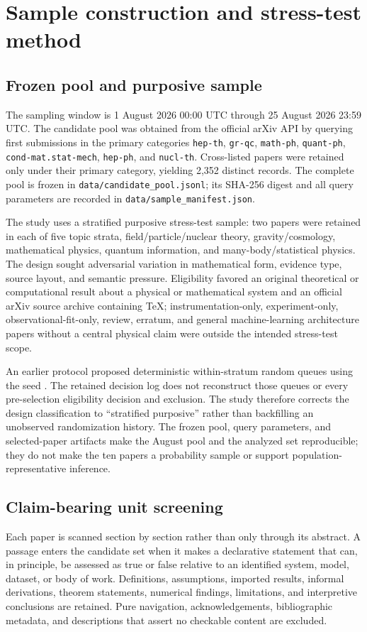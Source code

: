 \section{Sample construction and stress-test method}\label{sec:method}

\subsection{Frozen pool and purposive sample}
The sampling window is 1 August 2026 00:00 UTC through 25 August 2026 23:59 UTC. The candidate pool was obtained from the official arXiv API by querying first submissions in the primary categories \texttt{hep-th}, \texttt{gr-qc}, \texttt{math-ph}, \texttt{quant-ph}, \texttt{cond-mat.stat-mech}, \texttt{hep-ph}, and \texttt{nucl-th}. Cross-listed papers were retained only under their primary category, yielding 2,352 distinct records. The complete pool is frozen in \texttt{data/candidate\_pool.jsonl}; its SHA-256 digest and all query parameters are recorded in \texttt{data/sample\_manifest.json}.

The study uses a stratified purposive stress-test sample: two papers were retained in each of five topic strata, field/particle/nuclear theory, gravity/cosmology, mathematical physics, quantum information, and many-body/statistical physics. The design sought adversarial variation in mathematical form, evidence type, source layout, and semantic pressure. Eligibility favored an original theoretical or computational result about a physical or mathematical system and an official arXiv source archive containing TeX; instrumentation-only, experiment-only, observational-fit-only, review, erratum, and general machine-learning architecture papers without a central physical claim were outside the intended stress-test scope.

An earlier protocol proposed deterministic within-stratum random queues using the seed . The retained decision log does not reconstruct those queues or every pre-selection eligibility decision and exclusion. The study therefore corrects the design classification to ``stratified purposive'' rather than backfilling an unobserved randomization history. The frozen pool, query parameters, and selected-paper artifacts make the August pool and the analyzed set reproducible; they do not make the ten papers a probability sample or support population-representative inference.

\subsection{Claim-bearing unit screening}
Each paper is scanned section by section rather than only through its abstract. A passage enters the candidate set when it makes a declarative statement that can, in principle, be assessed as true or false relative to an identified system, model, dataset, or body of work. Definitions, assumptions, imported results, informal derivations, theorem statements, numerical findings, limitations, and interpretive conclusions are retained. Pure navigation, acknowledgements, bibliographic metadata, and descriptions that assert no checkable content are excluded.

